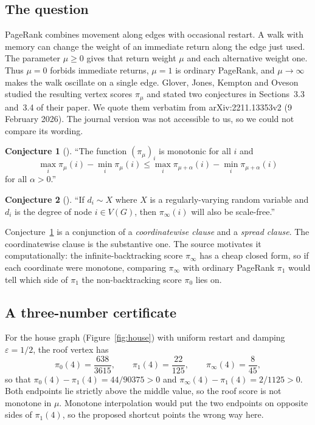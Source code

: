 \documentclass[11pt,a4paper]{article}
\theoremstyle{definition}\newtheorem{conjecture}{Conjecture}
\theoremstyle{remark}\newtheorem{remark}[theorem]{Remark}
\newcommand{\eps}{\varepsilon}
\begin{document}
\subsection{The question}
PageRank combines movement along edges with occasional restart. A walk with memory can change the weight of an immediate return along the edge just used. The parameter $\mu\geq0$ gives that return weight $\mu$ and each alternative weight one. Thus $\mu=0$ forbids immediate returns, $\mu=1$ is ordinary PageRank, and $\mu\to\infty$ makes the walk oscillate on a single edge. Glover, Jones, Kempton and Oveson \cite{glover,gloverarxiv} studied the resulting vertex scores $\pi_\mu$ and stated two conjectures in Sections~3.3 and~3.4 of their paper. We quote them verbatim from arXiv:2211.13353v2 (9 February 2026). The journal version \cite{glover} was not accessible to us, so we could not compare its wording.

\begin{conjecture}[{\cite[Conjecture 3.1]{gloverarxiv}}]\label{conj:31}
``The function $(\pi_{\mu})_{i}$ is monotonic for all $i$ and
\[
  \max_{i}\pi_{\mu}(i)-\min_{i}\pi_{\mu}(i)\leq\max_{i}\pi_{\mu+\alpha}(i)-\min_{i}\pi_{\mu+\alpha}(i)
\]
for all $\alpha>0$.''
\end{conjecture}

\begin{conjecture}[{\cite[Conjecture 3.2]{gloverarxiv}}]\label{conj:32}
``If $d_{i}\sim X$ where $X$ is a regularly-varying random variable and $d_{i}$ is the degree of node $i\in V(G)$, then $\pi_{\infty}(i)$ will also be scale-free.''
\end{conjecture}

Conjecture~\ref{conj:31} is a conjunction of a \emph{coordinatewise clause} and a \emph{spread clause}. The coordinatewise clause is the substantive one. The source motivates it computationally: the infinite-backtracking score $\pi_\infty$ has a cheap closed form, so if each coordinate were monotone, comparing $\pi_\infty$ with ordinary PageRank $\pi_1$ would tell which side of $\pi_1$ the non-backtracking score $\pi_0$ lies on.

\subsection{A three-number certificate}
For the house graph (Figure~\ref{fig:house}) with uniform restart and damping $\eps=1/2$, the roof vertex has
\begin{equation}\label{eq:shortcertificate}
 \pi_0(4)=\frac{638}{3615},\qquad
 \pi_1(4)=\frac{22}{125},\qquad
 \pi_\infty(4)=\frac{8}{45},
\end{equation}
so that $\pi_0(4)-\pi_1(4)=44/90375>0$ and $\pi_\infty(4)-\pi_1(4)=2/1125>0$. Both endpoints lie strictly above the middle value, so the roof score is not monotone in $\mu$. Monotone interpolation would put the two endpoints on opposite sides of $\pi_1(4)$, so the proposed shortcut points the wrong way here.
\end{document}
